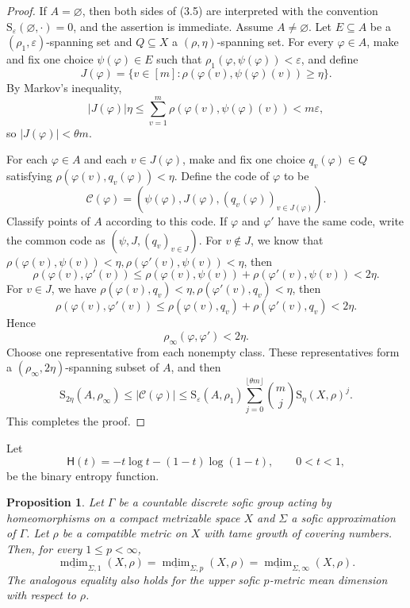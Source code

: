 \documentclass[12pt]{amsart}
\newtheorem{proposition}[theorem]{Proposition}
\theoremstyle{definition}
\theoremstyle{remark}
\newcommand{\mdim}{\operatorname{mdim}}
\newcommand{\cH}{\mathsf H}
\begin{document}
\begin{proof}
If $A=\varnothing$, then both sides of (3.5) are interpreted with the convention $\mathrm{S}_\varepsilon(\varnothing,\cdot)=0$, and the assertion is immediate. Assume $A\neq\varnothing$. Let $E\subseteq A$ be a $(\rho_1,\varepsilon)$-spanning set  and  $Q\subseteq X$  a $(\rho,\eta)$-spanning set. For every $\varphi\in A$, make and fix one choice
$\psi(\varphi)\in E$ such that
$\rho_1(\varphi,\psi(\varphi))<\varepsilon$, and define
\[
 J(\varphi)
 =\{v\in[m]:\rho(\varphi(v),\psi(\varphi)(v))\geq\eta\}.
\]
By Markov's inequality,
\[
 |J(\varphi)|\eta
 \leq \sum_{v=1}^m\rho(\varphi(v),\psi(\varphi)(v))
 <m\varepsilon,
\]
so $|J(\varphi)|<\theta m$.

For each $\varphi\in A$ and each $v\in J(\varphi)$, make and fix one choice
$q_v(\varphi)\in Q$ satisfying
$\rho(\varphi(v),q_v(\varphi))<\eta$. Define the code of $\varphi$ to be
\[
 \mathcal C(\varphi)
 =\left(\psi(\varphi),J(\varphi),
 (q_v(\varphi))_{v\in J(\varphi)}\right).
\]
Classify points of $A$ according to this code.
If $\varphi$ and $\varphi'$ have the same code, write the common code as
$(\psi,J,(q_v)_{v\in J})$. For $v\notin J$, we know that $\rho(\varphi(v),\psi(v))< \eta,\rho(\varphi'(v),\psi(v))< \eta$, then 
$$\rho(\varphi(v),\varphi'(v))\leq\rho(\varphi(v),\psi(v))+\rho(\varphi'(v),\psi(v))<2\eta.$$
For $v\in J$, we have $\rho(\varphi(v),q_v)<\eta,\rho(\varphi'(v),q_v)<\eta$, then
 $$\rho(\varphi(v),\varphi'(v))\leq\rho(\varphi(v),q_v)+\rho(\varphi'(v),q_v)<2\eta.$$Hence
\[
 \rho_\infty(\varphi,\varphi')<2\eta.
\]
Choose one representative from each nonempty class. These representatives form a $(\rho_{\infty},2\eta)$-spanning subset of $A$, and then $$\mathrm{S}_{2\eta}(A,\rho_\infty)\leq|\mathcal C(\varphi)|\leq \mathrm{S}_\varepsilon(A,\rho_1)
 \sum_{j=0}^{\lfloor\theta m\rfloor}
 \binom mj \mathrm{S}_\eta(X,\rho)^j.$$
 This completes the proof.
\end{proof}

Let
\[
 \cH(t)=-t\log t-(1-t)\log(1-t),\qquad 0<t<1,
\]
be the binary entropy function.

\begin{proposition}\label{prop:tame-equality}
Let $\Gamma$ be a countable discrete sofic group acting by homeomorphisms on a compact metrizable
space $X$ and $\Sigma$ a sofic approximation of $\Gamma$.
Let $\rho$ be a  compatible metric on $X$ with tame growth of covering numbers. Then, for every $1\leq p<\infty$,
\[
 \underline{\mdim}_{\Sigma,1}(X,\rho)
 =\underline{\mdim}_{\Sigma,p}(X,\rho)
 =\underline{\mdim}_{\Sigma,\infty}(X,\rho).
 \tag{3.6}
\]
The analogous equality also holds for the upper sofic $p$-metric mean dimension with respect to  $\rho$.
\end{proposition}
\end{document}

